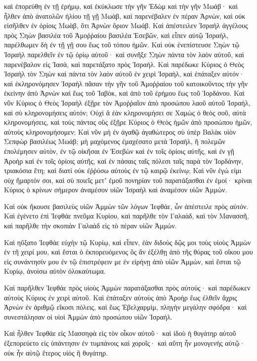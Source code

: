 {καὶ ἐπορεύθη ἐν τῇ ἐρήμῳ, καὶ ἐκύκλωσε τὴν γῆν Ἐδὼμ καὶ τὴν γῆν Μωάβ· καὶ ἦλθεν ἀπὸ ἀνατολῶν ἡλίου τῇ γῇ Μωὰβ, καὶ παρενέβαλεν ἐν πέραν Ἀρνὼν, καὶ οὐκ εἰσῆλθεν ἐν ὁρίοις Μωὰβ, ὅτι Ἀρνὼν ὅριον Μωάβ.
Καὶ ἀπέστειλεν Ἰσραὴλ ἀγγέλους πρὸς Σηὼν βασιλέα τοῦ Ἀμοῤῥαίου βασιλέα Ἐσεβῶν, καὶ εἶπεν αὐτῷ Ἰσραήλ, παρέλθωμεν δὴ ἐν τῇ γῇ σου ἕως τοῦ τόπου ἡμῶν.
Καὶ οὐκ ἐνεπίστευσε Σηὼν τῷ Ἰσραὴλ παρελθεῖν ἐν τῷ ὁρίῳ αὐτοῦ· καὶ συνῆξε Σηὼν πάντα τὸν λαὸν αὐτοῦ, καὶ παρενέβαλον εἰς Ἰασὰ, καὶ παρετάξατο πρὸς Ἰσραήλ.
Καὶ παρέδωκε Κύριος ὁ Θεὸς Ἰσραὴλ τὸν Σηὼν καὶ πάντα τὸν λαὸν αὐτοῦ ἐν χειρὶ Ἰσραὴλ, καὶ ἐπάταξεν αὐτόν· καὶ ἐκληρονόμησεν Ἰσραὴλ πᾶσαν τὴν γῆν τοῦ Ἀμοῤῥαίου τοῦ κατοικοῦντος τὴν γῆν ἐκείνην
ἀπὸ Ἀρνὼν καὶ ἕως τοῦ Ἰαβὸκ, καὶ ἀπὸ τοῦ ἐρήμου ἕως τοῦ Ἰορδάνου.
Καὶ νῦν Κύριος ὁ Θεὸς Ἰσραὴλ ἐξῇρε τὸν Ἀμοῤῥαῖον ἀπὸ προσώπου λαοῦ αὐτοῦ Ἰσραήλ, καὶ σὺ κληρονομήσεις αὐτόν;
Οὐχὶ ἃ ἐὰν κληρονομήσει σε Χαμὼς ὁ θεὸς σοῦ, αὐτὰ κληρονομήσεις, καὶ τοὺς πάντας οὓς ἐξῇρε Κύριος ὁ Θεὸς ἡμῶν ἀπὸ προσώπου ἡμῶν, αὐτοὺς κληρονομήσομεν;
Καὶ νῦν μὴ ἐν ἀγαθῷ ἀγαθώτερος σὺ ὑπὲρ Βαλὰκ υἱὸν Σεπφὼρ βασιλέως Μωάβ; μὴ μαχόμενος ἐμαχέσατο μετὰ Ἰσραὴλ, ἢ πολεμῶν ἐπολέμησεν αὐτὸν,
ἐν τῷ οἰκῆσαι ἐν Ἐσεβὼν καὶ ἐν τοῖς ὁρίοις αὐτῆς, καὶ ἐν γῇ Ἀροὴρ καὶ ἐν τοῖς ὁρίοις αὐτῆς, καὶ ἐν πάσαις ταῖς πόλεσι ταῖς παρὰ τὸν Ἰορδάνην, τριακόσια ἔτη; καὶ διατί οὐκ ἐῤῥύσω αὐτοὺς ἐν τῷ καιρῷ ἐκείνῳ;
Καὶ νῦν ἐγώ εἰμι οὐχ ἥμαρτόν σοι, καὶ σὺ ποιεῖς μετʼ ἐμοῦ πονηρίαν τοῦ παρατάξασθαι ἐν ἐμοί· κρίναι Κύριος ὁ κρίνων σήμερον ἀναμέσον υἱῶν Ἰσραὴλ καὶ ἀναμέσον υἱῶν Ἀμμών.
\par }{\PP {}Καὶ οὐκ ἤκουσε βασιλεὺς υἱῶν Ἀμμὼν τῶν λόγων Ἰεφθάε, ὧν ἀπέστειλε πρὸς αὐτόν.
Καὶ ἐγένετο ἐπὶ Ἰεφθάε πνεῦμα Κυρίου, καὶ παρῆλθε τὸν Γαλαὰδ, καὶ τὸν Μανασσῆ, καὶ παρῆλθε τὴν σκοπιὰν Γαλαὰδ εἰς τὸ πέραν υἱῶν Ἀμμών.
\par }{\PP {}Καὶ ηὔξατο Ἰεφθάε εὐχὴν τῷ Κυρίῳ, καὶ εἶπεν, ἐὰν διδοὺς δῷς μοι τοὺς υἱοὺς Ἁμμὼν ἐν τῆ χειρί μου,
καὶ ἔσται ὁ ἐκπορευόμενος ὃς ἂν ἐξέλθῃ ἀπὸ τῆς θύρας τοῦ οἴκου μου εἰς συνάντησίν μου ἐν τῷ ἐπιστρέφειν με ἐν εἰρήνῃ ἀπὸ υἱῶν Ἀμμὼν, καὶ ἔσται τῷ Κυρίῳ, ἀνοίσω αὐτὸν ὁλοκαύτωμα.
\par }{\PP {}Καὶ παρῆλθεν Ἰεφθάε πρὸς υἱοὺς Ἀμμὼν παρατάξασθαι πρὸς αὐτούς· καὶ παρέδωκεν αὐτοὺς Κύριος ἐν χειρὶ αὐτοῦ.
Καὶ ἐπάταξεν αὐτοὺς ἀπὸ Ἀροὴρ ἕως ἐλθεῖν ἄχρις Ἀρνὼν ἐν ἀριθμῷ εἴκοσι πόλεις, καὶ ἕως Ἐβελχαρμὶμ, πληγὴν μεγάλην σφόδρα· καὶ συνεστάλησαν οἱ υἱοὶ Ἀμμὼν ἀπὸ προσώπου υἱῶν Ἰσραήλ.
\par }{\PP {}Καὶ ἦλθεν Ἰεφθάε εἰς Μασσηφὰ εἰς τὸν οἶκον αὐτοῦ· καὶ ἰδοὺ ἡ θυγάτηρ αὐτοῦ ἐξεπορεύετο εἰς ὑπάντησιν ἐν τυμπάνοις καὶ χοροῖς· καὶ αὕτη ἦν μονογενὴς αὐτῷ· οὐκ ἦν αὐτῷ ἕτερος υἱὸς ἢ θυγάτηρ.
}
